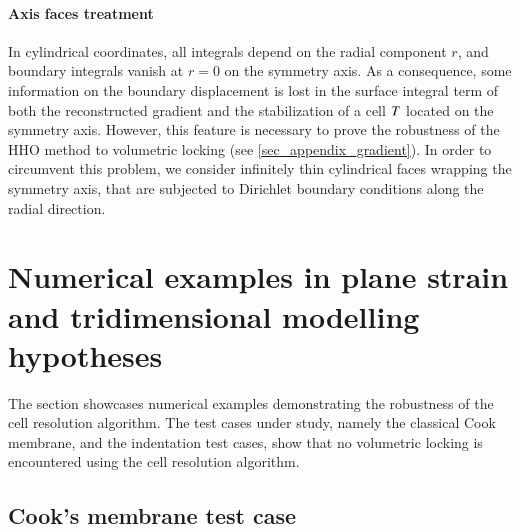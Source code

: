 \paragraph{Axis faces treatment}

In cylindrical coordinates, all integrals depend on the radial component $r$, and boundary integrals vanish at $r = 0$ on the symmetry axis.
As a consequence, some information on the boundary displacement is lost in the surface integral term of both the reconstructed gradient and the stabilization of a cell $T$ located on the symmetry axis.
However, this feature is necessary to prove the robustness of the HHO method to volumetric locking (see \ref{sec_appendix_gradient}).
In order to circumvent this problem, we consider infinitely thin cylindrical faces wrapping the symmetry axis, that are subjected to Dirichlet boundary conditions along the radial direction.

\section{Numerical examples in plane strain and tridimensional modelling hypotheses}
\label{sec_implementation_tridimensional_results}

The section showcases numerical examples demonstrating the robustness
of the cell resolution algorithm. The test cases under study, namely the
classical Cook membrane, and the indentation test cases, show that no
volumetric locking is encountered using the cell resolution algorithm.

\subsection{Cook's membrane test case}

